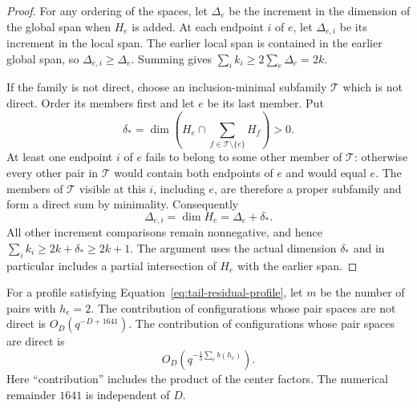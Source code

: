 \begin{proof}
For any ordering of the spaces, let $\Delta_e$ be the increment in
the dimension of the global span when $H_e$ is added.  At each
endpoint $i$ of $e$, let $\Delta_{e,i}$ be its increment in the local
span.  The earlier local span is contained in the earlier global
span, so $\Delta_{e,i}\ge\Delta_e$.  Summing gives
$\sum_i k_i\ge2\sum_e\Delta_e=2k$.

If the family is not direct, choose an inclusion-minimal subfamily
$\mathcal T$ which is not direct.  Order its members first and let
$e$ be its last member.  Put
\[
 \delta_*=\dim\left(H_e\cap
          \sum_{f\in\mathcal T\setminus\{e\}}H_f\right)>0.
\]
At least one endpoint $i$ of $e$ fails to belong to some other member
of $\mathcal T$: otherwise every other pair in $\mathcal T$ would
contain both endpoints of $e$ and would equal $e$.  The members of
$\mathcal T$ visible at this $i$, including $e$, are therefore a
proper subfamily and form a direct sum by minimality.  Consequently
\[
 \Delta_{e,i}=\dim H_e=\Delta_e+\delta_*.
\]
All other increment comparisons remain nonnegative, and hence
$\sum_i k_i\ge2k+\delta_*\ge2k+1$.  The argument uses the actual
dimension $\delta_*$ and in particular includes a partial intersection
of $H_e$ with the earlier span.
\end{proof}

\begin{lemma}\label{lem:tail-residual-counts}
For a profile satisfying Equation~\eqref{eq:tail-residual-profile},
let $m$ be the number of pairs with $h_e=2$.  The contribution of
configurations whose pair spaces are not direct is
$O_D(q^{-D+1641})$.  The contribution of configurations whose pair
spaces are direct is
\[
 O_D\left(q^{-\frac13\sum_e b(h_e)}\right).
\]
Here ``contribution'' includes the product of the center factors.
The numerical remainder $1641$ is independent of $D$.
\end{lemma}


